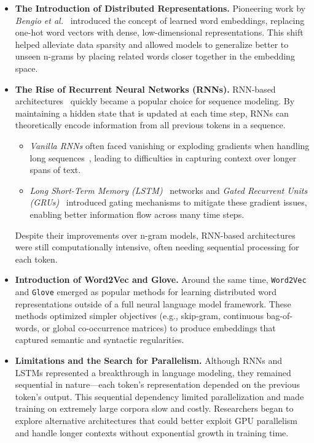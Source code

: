 \begin{itemize}
    \item \textbf{The Introduction of Distributed Representations.}
    Pioneering work by \emph{Bengio et al.}~\cite{bengio2003neural} introduced the concept of learned word embeddings, replacing one-hot word vectors with dense, low-dimensional representations. This shift helped alleviate data sparsity and allowed models to generalize better to unseen n-grams by placing related words closer together in the embedding space.

    \item \textbf{The Rise of Recurrent Neural Networks (RNNs).}
    RNN-based architectures~\cite{graves2013generating} quickly became a popular choice for sequence modeling. By maintaining a hidden state that is updated at each time step, RNNs can theoretically encode information from all previous tokens in a sequence. 
    \begin{itemize}
        \item \textit{Vanilla RNNs} often faced vanishing or exploding gradients when handling long sequences~\cite{pascanu2013difficulty}, leading to difficulties in capturing context over longer spans of text.
        \item \textit{Long Short-Term Memory (LSTM)}~\cite{hochreiter1997long} networks and \textit{Gated Recurrent Units (GRUs)}~\cite{cho2014learning} introduced gating mechanisms to mitigate these gradient issues, enabling better information flow across many time steps.
    \end{itemize}
    Despite their improvements over n-gram models, RNN-based architectures were still computationally intensive, often needing sequential processing for each token.

    \item \textbf{Introduction of Word2Vec and Glove.}
    Around the same time, \texttt{Word2Vec} and \texttt{Glove} emerged as popular methods for learning distributed word representations outside of a full neural language model framework. These methods optimized simpler objectives (e.g., skip-gram, continuous bag-of-words, or global co-occurrence matrices) to produce embeddings that captured semantic and syntactic regularities.

    \item \textbf{Limitations and the Search for Parallelism.}
    Although RNNs and LSTMs represented a breakthrough in language modeling, they remained sequential in nature—each token's representation depended on the previous token's output. This sequential dependency limited parallelization and made training on extremely large corpora slow and costly. Researchers began to explore alternative architectures that could better exploit GPU parallelism and handle longer contexts without exponential growth in training time.
\end{itemize}

